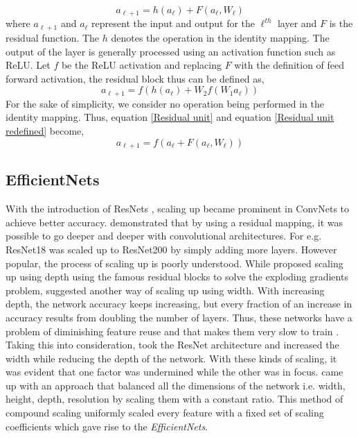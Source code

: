 \documentclass[fleqn,usenatbib]{mnras}
\begin{document}
\begin{equation}
    a_{\ell+1} = h(a_\ell) + F(a_\ell, W_\ell)
    \label{Residual unit}
\end{equation}
where $a_{\ell+1}$ and $a_\ell$ represent the input and output for the $\ell^{th}$ layer and $F$ is the residual function. The $h$ denotes the operation in the identity mapping. The output of the layer is generally processed using an activation function such as ReLU. Let $f$ be the ReLU activation and replacing $F$ with the definition of feed forward activation, the residual block thus can be defined as,
\begin{equation}
    a_{\ell+1} = f(h(a_\ell) + W_2f(W_1a_\ell))
    \label{Residual unit redefined}
\end{equation}
For the sake of simplicity, we consider no operation being performed in the identity mapping. Thus, equation \ref{Residual unit} and equation \ref{Residual unit redefined} become,
\begin{equation}
    a_{\ell+1} = f(a_\ell + F(a_\ell, W_\ell))
    \label{Final Residual notation}
\end{equation}
\subsection{EfficientNets}
\hspace{0.25 in}With the introduction of ResNets \citep{he2016}, scaling up became prominent in ConvNets to achieve better accuracy. \citet{he2016} demonstrated that by using a residual mapping, it was possible to go deeper and deeper with convolutional architectures. For e.g. ResNet18 was scaled up to ResNet200 by simply adding more layers. However popular, the process of scaling up is poorly understood. While \citet{he2016} proposed scaling up using depth using the famous residual blocks to solve the exploding gradients problem, \citet{Zagoruyko_2016} suggested another way of scaling up using width. With increasing depth, the network accuracy keeps increasing, but every fraction of an increase in accuracy results from doubling the number of layers. Thus, these networks have a problem of diminishing feature reuse and that makes them very slow to train \citep{Zagoruyko_2016}. Taking this into consideration, \citet{Zagoruyko_2016} took the ResNet architecture and increased the width while reducing the depth of the network. With these kinds of scaling, it was evident that one factor was undermined while the other was in focus. \citet{tan2019efficientnet} came up with an approach that balanced all the dimensions of the network i.e. width, height, depth, resolution by scaling them with a constant ratio. This method of compound scaling uniformly scaled every feature with a fixed set of scaling coefficients which gave rise to the \textit{EfficientNets}.
\end{document}
